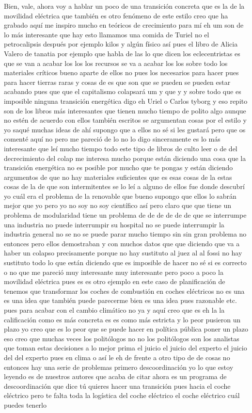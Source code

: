 Bien, vale, ahora voy a hablar un poco de una transición concreta que es la de la movilidad eléctrica que también es otro fenómeno de este estilo creo que ha grabado aquí me inspiro mucho en teóricos de crecimiento para mí eh um son de lo más interesante que hay esto llamamos una comida de Turiel no el petrocalipsis después por ejemplo kilos y algún físico así pues el libro de Alicia Valero de tanatia por ejemplo que habla de las lo que dicen los eclecentristas es que se van a acabar los los los recursos se va a acabar los los sobre todo los materiales críticos bueno aparte de ellos no pues los necesarios para hacer pues para hacer tierras raras y cosas de es que son que se pueden se pueden estar acabando pues que que el capitalismo colapsará um y que y y sobre todo que es imposible ninguna transición energética digo eh Uriel o Carlos tyborg y eso repito son de los libros más interesantes que tienen mucho tiempo de polito algo aunque no estén de acuerdo con ellos también escritos se argumentan cosas por el estilo y yo saqué muchas ideas de ahí supongo que a ellos no sé si les gustará pero que os comenté aquí no pero me pareció de lo no lo digo sinceramente es lo más interesante que leí mucho tiempo todo este tipo de libros de culto leer o de del decrecimiento del colap me interesa mucho porque están diciendo una cosa que la transición energética no es posible por mucho que te pongas y están diciendo argumentos de que no hay materiales suficientes que es esas cosas de la estas cosas de la de que son intermitentes se lo leí a alguno de ellos fue donde descubrí yo cuál era el problema de la renovable que bueno supongo que ellos lo sabrán mejor que yo pero yo no soy no soy científico así pero claro que que tiene un problema de modularidad tiene un problema de de de de de de que se interrumpe una industria no puede interrumpir su hospital no se puede interrumpir la industria general no se no se puede parar mucho tiempo sin sin gran problema no entonces pero ellos demostraban y con muchos datos que que diciendo que va a haber un colapso precisamente porque no hay sustituto al juez al al fossi no hay sustituto todo lo que están diciendo que es imposible de hacer no sé si es correcto o no que me pareció muy interesante muy interesante pero poco a poco la movilidad eléctrica pues es es otro ejemplo en este caso de planificación de tenemos que transformar los coches de combustión en coches eléctricos no es una es una idea que también puede parecerme bien es una idea pues razonable etc. pues para acabar con el cambio climático no ya y aquí creo que es eh la la calificación como es más concreta es es como más estricta y lo peor pusieron un plazo yo creo que es lo peor que se puede hacer en política pública poner un plazo eso creo que muchas veces los politólogos no no los politólogos son los analistas que toman estas decisiones a lo mejor prima el juicio el juicio del experto el juicio del del experto pues en clima o así le eh de frente a otro tipo de de cosas no entonces hay una serie de problemas primero descoordinación yo lo que estoy leyendo es de nuestros autores que acaba de citar ahora es un programa de descoordinación que dice tú quieres hacer una transición pues hacia el coche eléctrico pero te falta toda la logística del coche eléctrico el coche eléctrico cuál puedes tenerlo 